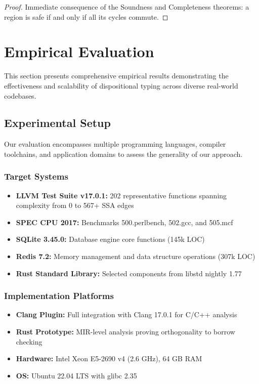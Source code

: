 \documentclass[journal]{IEEEtran}
\begin{document}
\begin{proof}
Immediate consequence of the Soundness and Completeness theorems: a region is safe if and only if all its cycles commute.
\end{proof}

\section{Empirical Evaluation}
\label{sec:evaluation}

This section presents comprehensive empirical results demonstrating the effectiveness and scalability of dispositional typing across diverse real-world codebases.

\subsection{Experimental Setup}

Our evaluation encompasses multiple programming languages, compiler toolchains, and application domains to assess the generality of our approach.

\subsubsection{Target Systems}

\begin{itemize}
\item \textbf{LLVM Test Suite v17.0.1:} 202 representative functions spanning complexity from 0 to 567+ SSA edges
\item \textbf{SPEC CPU 2017:} Benchmarks 500.perlbench, 502.gcc, and 505.mcf  
\item \textbf{SQLite 3.45.0:} Database engine core functions (145k LOC)
\item \textbf{Redis 7.2:} Memory management and data structure operations (307k LOC)
\item \textbf{Rust Standard Library:} Selected components from libstd nightly 1.77
\end{itemize}

\subsubsection{Implementation Platforms}

\begin{itemize}
\item \textbf{Clang Plugin:} Full integration with Clang 17.0.1 for C/C++ analysis
\item \textbf{Rust Prototype:} MIR-level analysis proving orthogonality to borrow checking
\item \textbf{Hardware:} Intel Xeon E5-2690 v4 (2.6 GHz), 64 GB RAM
\item \textbf{OS:} Ubuntu 22.04 LTS with glibc 2.35
\end{itemize}
\end{document}
